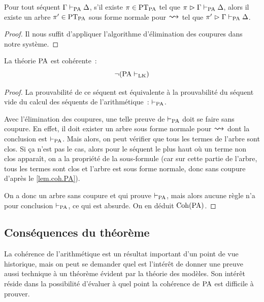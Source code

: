 \begin{theorem}
  Pour tout séquent $\Gamma\vdash_{\operatorname{PA}} \Delta$, s'il existe $\pi \in \operatorname{PT}_{\operatorname{PA}}$ tel
  que $\pi\mathrel{\rhd} \Gamma\vdash_{\operatorname{PA}}\Delta$, alors il existe un arbre
  $\pi' \in \operatorname{PT}_{\operatorname{PA}}$ sous forme normale pour $\reecr{}$ tel que
  $\pi'\mathrel{\rhd}\Gamma\vdash_{\operatorname{PA}}\Delta$.
\end{theorem}

\begin{proof}
  Il nous suffit d'appliquer l'algorithme d'élimination des coupures dans notre
  système.
\end{proof}

\begin{theorem}
  La théorie $\operatorname{PA}$ est cohérente~:
  \[\lnot(\operatorname{PA}\vdash_{\operatorname{LK}})\]
\end{theorem}

\begin{proof}
  La prouvabilité de ce séquent est équivalente à la prouvabilité du séquent
  vide du calcul des séquents de l'arithmétique~: $\vdash_{\operatorname{PA}}$.

  Avec l'élimination des coupures, une telle preuve de $\vdash_{\operatorname{PA}}$ doit se faire
  sans coupure. En effet, il doit exister un arbre sous forme normale pour
  $\reecr{}$ dont la conclusion est $\vdash_{\operatorname{PA}}$. Mais alors, on peut vérifier que
  tous les termes de l'arbre sont clos. Si ça n'est pas le cas, alors pour le
  séquent le plus haut où un terme non clos apparaît, on a la propriété de la
  sous-formule (car sur cette partie de l'arbre, tous les termes sont clos et
  l'arbre est sous forme normale, donc sans coupure d'après le
  \cref{lem.coh.PA}).

  On a donc un arbre sans coupure et qui prouve
  $\vdash_{\operatorname{PA}}$, mais alors aucune règle n'a pour conclusion $\vdash_{\operatorname{PA}}$, ce qui est
  absurde. On en déduit $\operatorname{Coh}(\operatorname{PA})$.
\end{proof}

\subsection{Conséquences du théorème}

La cohérence de l'arithmétique est un résultat important d'un point de vue
historique, mais on peut se demander quel est l'intérêt de donner une preuve
aussi technique à un théorème évident par la théorie des modèles. Son intérêt
réside dans la possibilité d'évaluer à quel point la cohérence de
$\operatorname{PA}$ est difficile à prouver.

